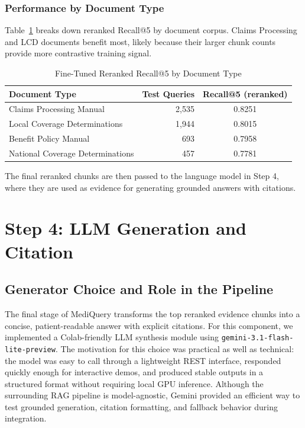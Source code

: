 \documentclass[10pt, letterpaper]{article}
\begin{document}
\subsubsection{Performance by Document Type}

Table~\ref{tab:ft-doctype} breaks down reranked Recall@5 by document corpus. Claims
Processing and LCD documents benefit most, likely because their larger chunk counts
provide more contrastive training signal.

\begin{table}[h]
\centering
\caption{Fine-Tuned Reranked Recall@5 by Document Type}
\label{tab:ft-doctype}
\begin{tabular}{@{}lrc@{}}
\toprule
\textbf{Document Type} & \textbf{Test Queries} & \textbf{Recall@5 (reranked)} \\
\midrule
Claims Processing Manual  & 2,535 & 0.8251 \\
Local Coverage Determinations & 1,944 & 0.8015 \\
Benefit Policy Manual     & 693   & 0.7958 \\
National Coverage Determinations & 457 & 0.7781 \\
\bottomrule
\end{tabular}
\end{table}

The final reranked chunks are then passed to the language model in Step 4, where they are used as evidence for generating grounded answers with citations.

\newpage

\section{Step 4: LLM Generation and Citation}

\subsection{Generator Choice and Role in the Pipeline}

The final stage of MediQuery transforms the top reranked evidence chunks into a concise,
patient-readable answer with explicit citations. For this component, we implemented a
Colab-friendly LLM synthesis module using \texttt{gemini-3.1-flash-} \texttt{lite-preview}. The
motivation for this choice was practical as well as technical: the model was easy to call
through a lightweight REST interface, responded quickly enough for interactive demos, and
produced stable outputs in a structured format without requiring local GPU inference.
Although the surrounding RAG pipeline is model-agnostic, Gemini provided an efficient way
to test grounded generation, citation formatting, and fallback behavior during integration.
\end{document}
